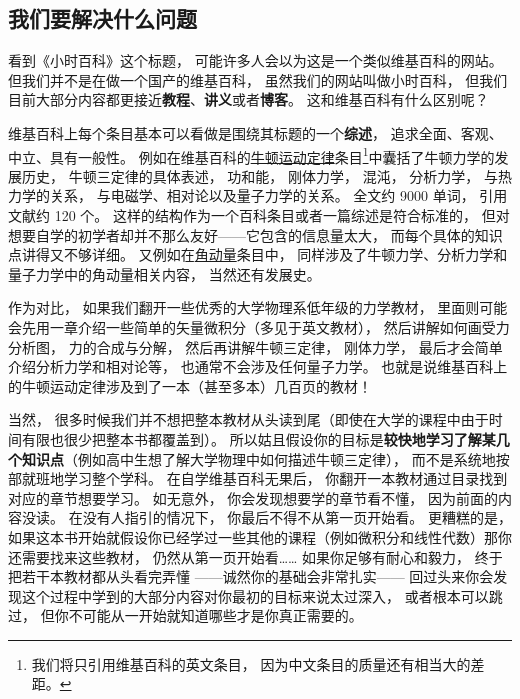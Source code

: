 
\subsection{我们要解决什么问题}

看到《小时百科》这个标题， 可能许多人会以为这是一个类似维基百科的网站。 但我们并不是在做一个国产的维基百科， 虽然我们的网站叫做小时百科， 但我们目前大部分内容都更接近\textbf{教程}、\textbf{讲义}或者\textbf{博客}。 这和维基百科有什么区别呢？

维基百科上每个条目基本可以看做是围绕其标题的一个\textbf{综述}， 追求全面、客观、中立、具有一般性。 例如在维基百科的\href{https://en.wikipedia.org/wiki/Newton's_laws_of_motion}{牛顿运动定律}条目\footnote{我们将只引用维基百科的英文条目， 因为中文条目的质量还有相当大的差距。}中囊括了牛顿力学的发展历史， 牛顿三定律的具体表述， 功和能， 刚体力学， 混沌， 分析力学， 与热力学的关系， 与电磁学、相对论以及量子力学的关系。 全文约 9000 单词， 引用文献约 120 个。 这样的结构作为一个百科条目或者一篇综述是符合标准的， 但对想要自学的初学者却并不那么友好——它包含的信息量太大， 而每个具体的知识点讲得又不够详细。 又例如在\href{https://en.wikipedia.org/wiki/Angular_momentum}{角动量}条目中， 同样涉及了牛顿力学、分析力学和量子力学中的角动量相关内容， 当然还有发展史。

作为对比， 如果我们翻开一些优秀的大学物理系低年级的力学教材， 里面则可能会先用一章介绍一些简单的矢量微积分（多见于英文教材）， 然后讲解如何画受力分析图， 力的合成与分解， 然后再讲解牛顿三定律， 刚体力学， 最后才会简单介绍分析力学和相对论等， 也通常不会涉及任何量子力学。 也就是说维基百科上的牛顿运动定律涉及到了一本（甚至多本）几百页的教材！

当然， 很多时候我们并不想把整本教材从头读到尾（即使在大学的课程中由于时间有限也很少把整本书都覆盖到）。 所以姑且假设你的目标是\textbf{较快地学习了解某几个知识点}（例如高中生想了解大学物理中如何描述牛顿三定律）， 而不是系统地按部就班地学习整个学科。 在自学维基百科无果后， 你翻开一本教材通过目录找到对应的章节想要学习。 如无意外， 你会发现想要学的章节看不懂， 因为前面的内容没读。 在没有人指引的情况下， 你最后不得不从第一页开始看。 更糟糕的是， 如果这本书开始就假设你已经学过一些其他的课程（例如微积分和线性代数）那你还需要找来这些教材， 仍然从第一页开始看…… 如果你足够有耐心和毅力， 终于把若干本教材都从头看完弄懂 ——诚然你的基础会非常扎实—— 回过头来你会发现这个过程中学到的大部分内容对你最初的目标来说太过深入， 或者根本可以跳过， 但你不可能从一开始就知道哪些才是你真正需要的。

